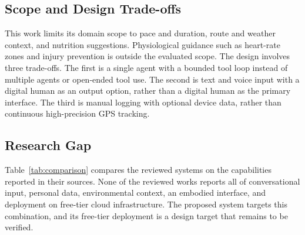\subsection{Scope and Design Trade-offs}
This work limits its domain scope to pace and duration, route and weather context, and nutrition suggestions. Physiological guidance such as heart-rate zones and injury prevention is outside the evaluated scope. The design involves three trade-offs. The first is a single agent with a bounded tool loop instead of multiple agents or open-ended tool use. The second is text and voice input with a digital human as an output option, rather than a digital human as the primary interface. The third is manual logging with optional device data, rather than continuous high-precision GPS tracking.

\subsection{Research Gap}
Table~\ref{tab:comparison} compares the reviewed systems on the capabilities reported in their sources. None of the reviewed works reports all of conversational input, personal data, environmental context, an embodied interface, and deployment on free-tier cloud infrastructure. The proposed system targets this combination, and its free-tier deployment is a design target that remains to be verified.

